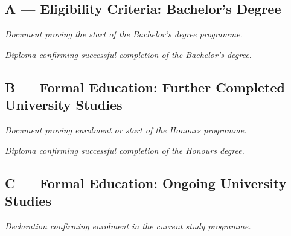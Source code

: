 \documentclass[12pt,a4paper]{article}
\newcommand{\insertdoc}[2]{%
  \begin{tcolorbox}[placeholderbox, title={$\Rightarrow$ #1}]
    \small\textit{#2}
  \end{tcolorbox}
  \vspace{4pt}
}
\begin{document}
\subsection{A — Eligibility Criteria: Bachelor's Degree}
\insertdoc{Exmatrikulationsschreiben (Proof of Start of Bachelor's)}{
  Document proving the start of the Bachelor's degree programme.
}

 
\insertdoc{Bachelor's Diploma (Proof of Completion)}{
  Diploma confirming successful completion of the Bachelor's degree.
}

 
\subsection{B — Formal Education: Further Completed University Studies}

\insertdoc{Proof of Start of Honours Degree}{
  Document proving enrolment or start of the Honours programme.
}

 
\insertdoc{Honours Diploma (Proof of Completion)}{
  Diploma confirming successful completion of the Honours degree.
}

 
\subsection{C — Formal Education: Ongoing University Studies}

\insertdoc{Declaration of Enrolment}{
  Declaration confirming enrolment in the current study programme.
}

 
\end{document}
